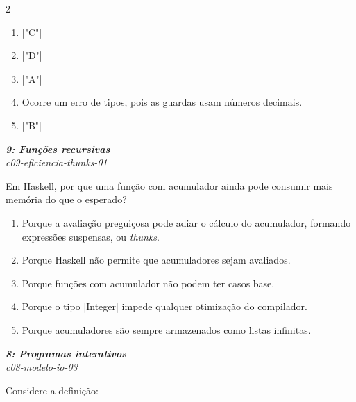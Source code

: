 \documentclass[a4paper,10pt,brazil]{article}
\begin{document}
\begin{multicols}{2}
\begin{enumerate}
  \item \haskellinline|"C"|

  \item \haskellinline|"D"|

  \item \haskellinline|"A"|

  \item Ocorre um erro de tipos, pois as guardas usam números decimais.

  \item \haskellinline|"B"|


\end{enumerate}

\begin{flushright}
  \footnotesize
  \textit{\textbf{9: Funções recursivas}}\\
  \textit{c09-eficiencia-thunks-01}\\

\end{flushright}
Em Haskell, por que uma função com acumulador ainda pode consumir mais memória do que o esperado?

\begin{enumerate}
  \item Porque a avaliação preguiçosa pode adiar o cálculo do acumulador, formando expressões suspensas, ou \emph{thunks}.

  \item Porque Haskell não permite que acumuladores sejam avaliados.

  \item Porque funções com acumulador não podem ter casos base.

  \item Porque o tipo \haskellinline|Integer| impede qualquer otimização do compilador.

  \item Porque acumuladores são sempre armazenados como listas infinitas.


\end{enumerate}

\begin{flushright}
  \footnotesize
  \textit{\textbf{8: Programas interativos}}\\
  \textit{c08-modelo-io-03}\\

\end{flushright}
Considere a definição:


\end{multicols}
\end{document}
